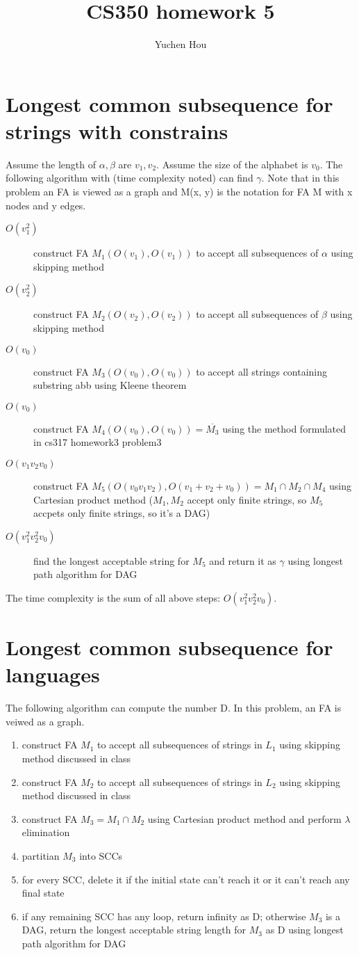 \documentclass{article}
\begin{document}
\lstset{language=Java}
\title{CS350 homework 5}
\author{Yuchen Hou}
\maketitle
\section{Longest common subsequence for strings with constrains}
Assume the length of $\alpha, \beta$ are $v_1, v_2$. Assume the size of
the alphabet is $v_0$. The following algorithm with (time complexity noted) can
find $\gamma$. Note that in this problem an FA is viewed as a graph and M(x, y)
is the notation for FA M with x nodes and y edges.
\begin{description}
  \item[$O(v_1^2)$] construct FA $M_1(O(v_1), O(v_1))$ to accept all
  subsequences of $\alpha$ using skipping method
  \item[$O(v_2^2)$] construct FA $M_2(O(v_2), O(v_2))$ to accept all
  subsequences of $\beta$ using skipping method
  \item[$O(v_0)$] construct FA $M_3(O(v_0), O(v_0))$ to accept all strings
  containing substring abb using Kleene theorem
  \item[$O(v_0)$] construct FA $M_4(O(v_0), O(v_0)) = \overline{M_3}$ using
  the method formulated in cs317 homework3 problem3
  \item[$O(v_1v_2v_0)$] construct FA $M_5(O(v_0v_1v_2), O(v_1 + v_2 +
  v_0)) = M_1 \cap M_2 \cap M_4$ using Cartesian product method ($M_1, M_2$
  accept only finite strings, so $M_5$ accpets only finite strings, so it's a
  DAG)
  \item[$O(v_1^2v_2^2v_0)$] find the longest acceptable string for $M_5$ and
  return it as $\gamma$ using longest path algorithm for DAG
\end{description}
The time complexity is the sum of all above steps: $O(v_1^2v_2^2v_0)$.
\section{Longest common subsequence for languages}
The following algorithm can compute the number D. In this problem, an FA is
veiwed as a graph.
\begin{enumerate}
  \item construct FA $M_1$ to accept all subsequences of strings in $L_1$ using
  skipping method discussed in class
  \item construct FA $M_2$ to accept all subsequences of strings in $L_2$ using
  skipping method discussed in class
  \item construct FA $M_3  = M_1 \cap M_2$ using Cartesian product method and
  perform $\lambda$ elimination
  \item partitian $M_3$ into SCCs
  \item for every SCC, delete it if the initial state can't reach it or it can't
  reach any final state
  \item if any remaining SCC has any loop, return infinity as D; otherwise $M_3$
  is a DAG, return the longest acceptable string length for $M_3$ as D using
  longest path algorithm for DAG
\end{enumerate}
\end{document}
